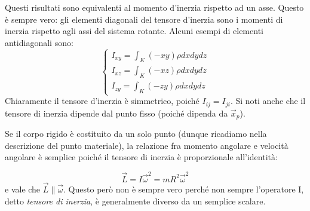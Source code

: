 \documentclass[a4paper,openany]{article}
\begin{document}
	Questi risultati sono equivalenti al momento d'inerzia rispetto ad un asse. Questo è sempre vero: gli elementi diagonali del tensore d'inerzia sono i momenti di inerzia rispetto agli assi del sistema rotante. Alcuni esempi di elementi antidiagonali sono:
	\begin{equation}\label{key}
		\begin{cases}
			I_{xy} = \int_{K}(-xy)\rho dxdydz  \\
			I_{xz} = \int_{K}(-xz)\rho dxdydz \\
			I_{zy} = \int_{K}(-zy)\rho dxdydz 
		\end{cases}
	\end{equation}
	Chiaramente il tensore d'inerzia è simmetrico, poiché $I_{ij} = I_{ji}$. Si noti anche che il tensore di inerzia dipende dal punto fisso (poiché dipenda da $\vec{x}_p$).
	
	Se il corpo rigido è costituito da un solo punto (dunque ricadiamo nella descrizione del punto materiale), la relazione fra momento angolare e velocità angolare è semplice poiché il tensore di inerzia è proporzionale all'identità:
	
	$$
	\vec{L} = I\vec{\omega}^{2} = mR^{2} \vec{\omega}^{2}
	$$
	e vale che $\vec{L} \parallel \vec{\omega}$. Questo però non è sempre vero perché non sempre l'operatore I, detto \textit{tensore di inerzia}, è generalmente diverso da un semplice scalare.
\end{document}
